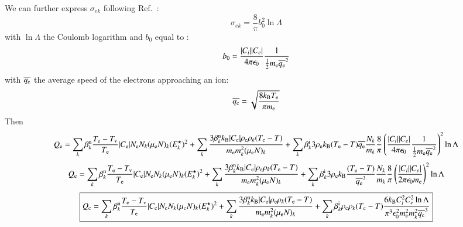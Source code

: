 \documentclass{warpdoc}
\newcommand\frameeqn[1]{\fbox{$\displaystyle #1$}}
\begin{document}
We can further express  $\sigma_{ek}$ following Ref.~\cite[page 58]{book:2004:lieberman}:
%
\begin{equation}
\sigma_{ek}= \frac{8}{\pi} b_0^2 \ln \Lambda
\end{equation}
%
with $\ln \Lambda$ the Coulomb logarithm and $b_0$ equal to \cite[page 56]{book:2004:lieberman}:
%
\begin{equation}
b_0 = \frac{|C_i| |C_e|}{4 \pi \epsilon_0 } \frac{1}{\frac{1}{2} m_{\rm e} \overline{q_{\rm e}}^2}
\end{equation}
%
with $\overline{q_{\rm e}}$ the average speed of the electrons approaching an ion:
%
\begin{equation}
\overline{q_{\rm e}} = \sqrt{\frac{8 k_{\rm B} T_{\rm e}}{\pi m_{\rm e}}}
\end{equation}
%
Then 
%
\begin{equation}
Q_{\rm e}
= 
   \sum_k \beta_k^{\rm n} \frac{T_{\rm e}-T_{\rm v}}{T_{\rm e}} |C_{\rm e}| N_{\rm e} N_k (\mu_{\rm e}  N)_k  (E^\star_k)^2
 + \sum_k  \frac{3 \beta_k^{\rm n} k_{\rm B} |C_{\rm e}| \rho_{\rm e} \rho_k  (T_{\rm e}-T)}{m_{\rm e} m_k^2 (\mu_{\rm e}N)_k}        
 + \sum_k \beta_k^{\rm i} 3 \rho_{\rm e} k_{\rm B} (T_{\rm e}-T) \overline{q_{\rm e}} \frac{N_k}{m_k} \frac{8}{\pi} \left(\frac{|C_i| |C_e|}{4 \pi \epsilon_0 } \frac{1}{\frac{1}{2} m_{\rm e} \overline{q_{\rm e}}^2}\right)^2 \ln \Lambda
\end{equation}
%
%
\begin{equation}
Q_{\rm e}
= 
   \sum_k \beta_k^{\rm n} \frac{T_{\rm e}-T_{\rm v}}{T_{\rm e}} |C_{\rm e}| N_{\rm e} N_k (\mu_{\rm e}  N)_k  (E^\star_k)^2
 + \sum_k  \frac{3 \beta_k^{\rm n} k_{\rm B} |C_{\rm e}| \rho_{\rm e} \rho_k  (T_{\rm e}-T)}{m_{\rm e} m_k^2 (\mu_{\rm e}N)_k}        
 + \sum_k \beta_k^{\rm i} 3 \rho_{\rm e} k_{\rm B} \frac{(T_{\rm e}-T)}{\overline{q_{\rm e}}^3}  \frac{N_k}{m_k} \frac{8}{\pi} \left(\frac{|C_i| |C_e|}{2 \pi \epsilon_0 m_{\rm e}} \right)^2 \ln \Lambda
\end{equation}
%
%
\begin{equation}
\frameeqn{
Q_{\rm e}
= 
   \sum_k \beta_k^{\rm n} \frac{T_{\rm e}-T_{\rm v}}{T_{\rm e}} |C_{\rm e}| N_{\rm e} N_k (\mu_{\rm e}  N)_k  (E^\star_k)^2
 + \sum_k  \frac{3 \beta_k^{\rm n} k_{\rm B} |C_{\rm e}| \rho_{\rm e} \rho_k  (T_{\rm e}-T)}{m_{\rm e} m_k^2 (\mu_{\rm e}N)_k}        
 + \sum_k \beta_k^{\rm i}  \rho_{\rm e} \rho_k  (T_{\rm e}-T )  \frac{6 k_{\rm B} C_i^2 C_e^2 \ln \Lambda}{ \pi^3 \epsilon_0^2 m_{\rm e}^2 m_k^2 \overline{q_{\rm e}}^3}  
}
\end{equation}
\end{document}
